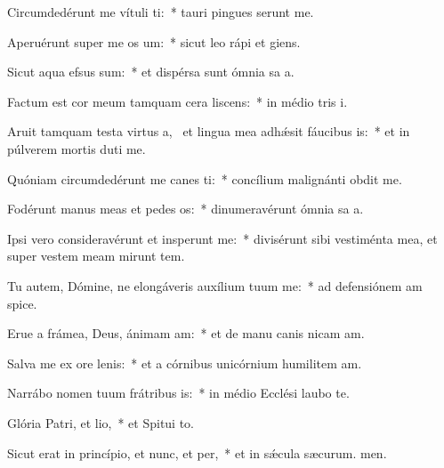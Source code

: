 \item Circumdedérunt me vítuli ti:~* tauri pingues serunt me.
\item Aperuérunt super me os um:~* sicut leo rápi et giens.
\item Sicut aqua efsus sum:~* et dispérsa sunt ómnia sa a.
\item Factum est cor meum tamquam cera liscens:~* in médio tris i.
\item Aruit tamquam testa virtus a,~\pscross{} et lingua mea adhǽsit fáucibus is:~* et in púlverem mortis duti me.
\item Quóniam circumdedérunt me canes ti:~* concílium malignánti obdit me.
\item Fodérunt manus meas et pedes os:~* dinumeravérunt ómnia sa a.
\item Ipsi vero consideravérunt et insperunt me:~* divisérunt sibi vestiménta mea, et super vestem meam mirunt tem.
\item Tu autem, Dómine, ne elongáveris auxílium tuum  me:~* ad defensiónem am spice.
\item Erue a frámea, Deus, ánimam am:~* et de manu canis nicam am.
\item Salva me ex ore lenis:~* et a córnibus unicórnium humilitem am.
\item Narrábo nomen tuum frátribus is:~* in médio Ecclési laubo te.
\item Glória Patri, et lio,~* et Spitui to.
\item Sicut erat in princípio, et nunc, et per,~* et in sǽcula sæcurum. men.
